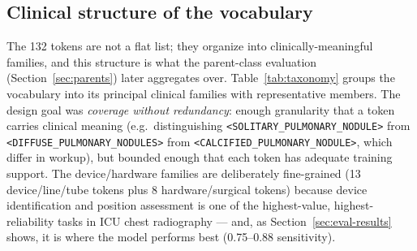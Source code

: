 \documentclass[11pt,a4paper]{article}
\begin{document}
\subsection{Clinical structure of the vocabulary}
\label{sec:taxonomy}
The 132 tokens are not a flat list; they organize into clinically-meaningful families, and this structure is what the parent-class evaluation (Section~\ref{sec:parents}) later aggregates over. Table~\ref{tab:taxonomy} groups the vocabulary into its principal clinical families with representative members. The design goal was \emph{coverage without redundancy}: enough granularity that a token carries clinical meaning (e.g.\ distinguishing \texttt{<SOLITARY\_PULMONARY\_NODULE>} from \texttt{<DIFFUSE\_PULMONARY\_NODULES>} from \texttt{<CALCIFIED\_PULMONARY\_NODULE>}, which differ in workup), but bounded enough that each token has adequate training support. The device/hardware families are deliberately fine-grained (13 device/line/tube tokens plus 8 hardware/surgical tokens) because device identification and position assessment is one of the highest-value, highest-reliability tasks in ICU chest radiography --- and, as Section~\ref{sec:eval-results} shows, it is where the model performs best (0.75--0.88 sensitivity).
\end{document}

